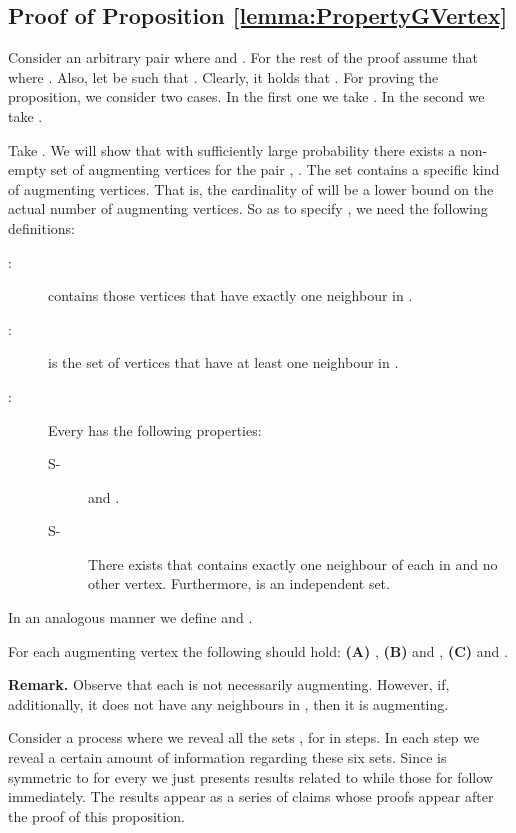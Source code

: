 \documentclass[a4paper,10pt]{article}
\begin{document}
\subsection{Proof of Proposition \ref{lemma:PropertyGVertex}}\label{sec:PropoGVertex}

Consider  an arbitrary pair 
where  and .
For the rest of the proof assume that  where
. Also, let  be such that . Clearly, it holds that . 
For proving the proposition, we consider two cases.
In the first one we take . In the second  we take .



Take . We will show that with sufficiently large
probability  there exists a non-empty set  of augmenting
vertices for the pair , . The set  contains a
specific kind of augmenting vertices. That is, the cardinality of
 will be a lower bound on the actual number of augmenting
vertices. So as to specify , we need  the following definitions:


\begin{description}
\item[:]   contains those vertices that have exactly one neighbour
in .

\item [:]  
is the  set of vertices that have at least one neighbour in .


\item [:]  Every  has the following properties: 
\begin{description}
	\item[S-]  and 
	. 
	\item[S-] There exists  that contains exactly
	one neighbour of each  in 
	and no other vertex. Furthermore,  is an independent set.
\end{description}
\end{description}
In an analogous manner we define  and .


For each augmenting vertex   the following should hold:
{\bf (A)} , 
{\bf (B)}  and
,
{\bf (C)}   and  .
\\ \vspace{-.1cm}


\noindent
{\bf Remark.}
Observe that each  is not necessarily
augmenting. However, if, additionally,  it does not have any neighbours 
in  , then it is augmenting.
\\ \vspace{-.2cm}


\noindent
Consider a process where we reveal all the sets ,
for  in steps. In each step we reveal a certain amount of
information regarding these six sets. Since  is symmetric 
to  for every  we just presents results related to 
 while those for  follow immediately. The results 
appear as a series of claims whose proofs appear after the proof of this 
proposition.
\end{document}
